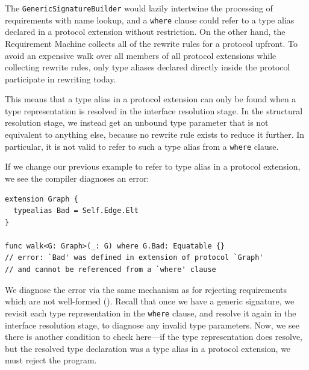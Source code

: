 \documentclass[../generics]{subfiles}
\begin{document}
\begin{example}\label{ex:gsb legacy type alias}
The \texttt{GenericSignatureBuilder} would lazily intertwine the processing of requirements with name lookup, and a \texttt{where} clause could refer to a type alias declared in a protocol extension without restriction. On the other hand, the Requirement Machine collects all of the rewrite rules for a protocol upfront. To avoid an expensive walk over all members of all protocol extensions while collecting rewrite rules, only type aliases declared directly inside the protocol participate in rewriting today.

This means that a type alias in a protocol extension can only be found when a type representation is resolved in the interface resolution stage. In the structural resolution stage, we instead get an unbound type parameter that is not equivalent to anything else, because no rewrite rule exists to reduce it further. In particular, it is not valid to refer to such a type alias from a \texttt{where} clause.

If we change our previous example to refer to type alias in a protocol extension, we see the compiler diagnoses an error:
\begin{Verbatim}
extension Graph {
  typealias Bad = Self.Edge.Elt
}

func walk<G: Graph>(_: G) where G.Bad: Equatable {}
// error: `Bad' was defined in extension of protocol `Graph'
// and cannot be referenced from a `where' clause
\end{Verbatim}
We diagnose the error via the same mechanism as for rejecting requirements which are not well-formed (). Recall that once we have a generic signature, we revisit each type representation in the \texttt{where} clause, and resolve it again in the interface resolution stage, to diagnose any invalid type parameters. Now, we see there is another condition to check here---if the type representation does resolve, but the resolved type declaration was a type alias in a protocol extension, we must reject the program.
\end{example}
\end{document}
